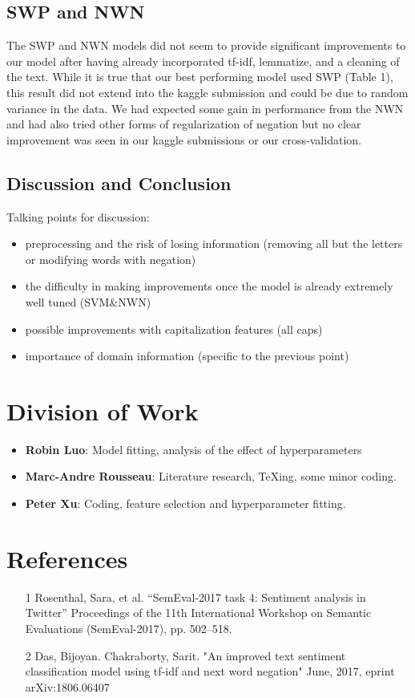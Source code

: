 \documentclass{amsart}
\theoremstyle{definition}
\theoremstyle{remark}
\numberwithin{equation}{section}
\begin{document}
\subsection{SWP and NWN}
The SWP and NWN models did not seem to provide significant improvements to our model after having already incorporated tf-idf, lemmatize, and a cleaning of the text.  While it is true that our best performing model used SWP (Table 1), this result did not extend into the kaggle submission and could be due to random variance in the data.  We had expected some gain in performance from the NWN and had also tried other forms of regularization of negation but no clear improvement was seen in our kaggle submissions or our cross-validation.  
\subsection{Discussion and Conclusion}
Talking points for discussion:
\begin{itemize}
	\item preprocessing and the risk of losing information (removing all but the letters or modifying words with negation)
	\item the difficulty in making improvements once the model is already extremely well tuned (SVM\&NWN)
	\item possible improvements with capitalization features (all caps)
	\item importance of domain information (specific to the previous point)
\end{itemize}
\section{Division of Work}
\begin{itemize}
\item{\textbf{Robin Luo}}: Model fitting, analysis of the effect of hyperparameters
\item{\textbf{Marc-Andre Rousseau}}: Literature research, TeXing, some minor coding.
\item{\textbf{Peter Xu}}: Coding, feature selection and hyperparameter fitting.
\end{itemize}
\section{References}
\begin{itemize}
	\item [1] Rosenthal, Sara, et al. “SemEval-2017 task 4: Sentiment analysis in Twitter” Proceedings of the 11th International Workshop on Semantic Evaluations (SemEval-2017), pp. 502–518.
	\item [2] Das, Bijoyan. Chakraborty, Sarit. "An improved text sentiment classification model using tf-idf and next word negation" June, 2017, eprint arXiv:1806.06407
\end{itemize}
\end{document}
